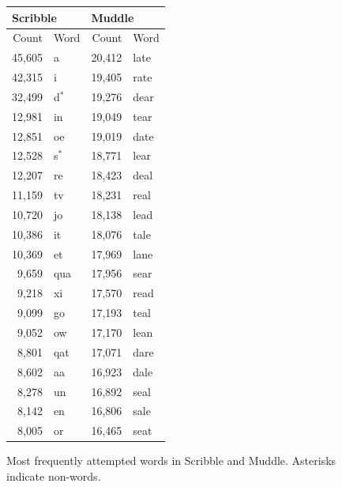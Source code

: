 \documentclass[twocolumn]{article}
\begin{document}
\begin{figure}
\begin{tabular}{|rl@{\qquad}rl|}
\multicolumn{2}{l}{{\bf \large Scribble}} &
\multicolumn{2}{l}{{\bf \large Muddle}} \\
\hline
Count & Word & Count & Word \\
\hline
45,605  &  a        &     20,412  &  late  \\
42,315  &  i        &     19,405  &  rate  \\
32,499  &  d$^*$    &     19,276  &  dear  \\
12,981  &  in       &     19,049  &  tear  \\
12,851  &  oe       &     19,019  &  date  \\
12,528  &  s$^*$    &     18,771  &  lear  \\
12,207  &  re       &     18,423  &  deal  \\
11,159  &  tv       &     18,231  &  real  \\
10,720  &  jo       &     18,138  &  lead  \\
10,386  &  it       &     18,076  &  tale  \\
10,369  &  et       &     17,969  &  lane  \\
9,659   &  qua      &     17,956  &  sear  \\
9,218   &  xi       &     17,570  &  read  \\
9,099   &  go       &     17,193  &  teal  \\
9,052   &  ow       &     17,170  &  lean  \\
8,801   &  qat      &     17,071  &  dare  \\
8,602   &  aa       &     16,923  &  dale  \\
8,278   &  un       &     16,892  &  seal  \\
8,142   &  en       &     16,806  &  sale  \\
8,005   &  or       &     16,465  &  seat  \\
\hline
\end{tabular}
\caption{Most frequently attempted words in Scribble and Muddle. Asterisks
indicate non-words.}
\label{fig:mostfrequent}
\end{figure}
\end{document}
